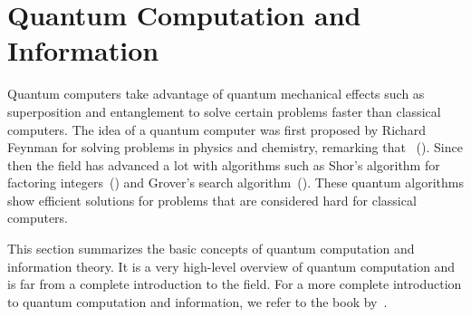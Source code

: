 \documentclass[a4paper,10pt]{article}
\begin{document}
\section{Quantum Computation and Information} \label{sec:quantum-computation-information}
Quantum computers take advantage of quantum mechanical effects such as superposition and entanglement to solve certain problems faster than classical computers.
The idea of a quantum computer was first proposed by Richard Feynman for solving problems in physics and chemistry, remarking that ~(\cite{feynman-simulating}).
Since then the field has advanced a lot with algorithms such as Shor's algorithm for factoring integers~(\cite{shor-factoring}) and Grover's search algorithm~(\cite{grover-search}).
These quantum algorithms show efficient solutions for problems that are considered hard for classical computers.

This section summarizes the basic concepts of quantum computation and information theory.
It is a very high-level overview of quantum computation and is far from a complete introduction to the field.
For a more complete introduction to quantum computation and information, we refer to the book by~\textcite{nielsen-chuang}.
\end{document}
